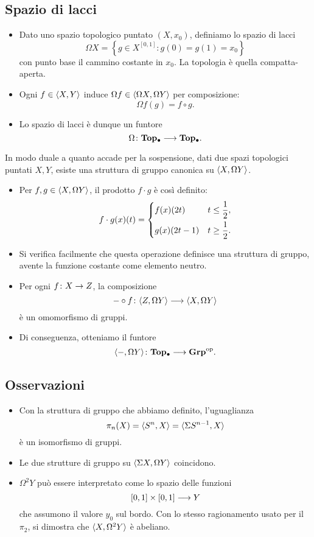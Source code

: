 \subsection*{Spazio di lacci}
\begin{frame*}
\begin{itemize}[<+->]
\item Dato uno spazio topologico puntato $(X,x_0)$, definiamo lo spazio di lacci
\[
\Omega X=\left\{g\in X^{[0,1]}:g(0)=g(1)=x_0\right\}
\]
con punto base il cammino costante in $x_0$. La topologia è quella compatta-aperta.
\item Ogni $f\in\langle X,Y\rangle$ induce $\Omega f\in\langle \Omega X,\Omega Y\rangle$ per composizione:
\[
\Omega f(g)=f\circ g.
\]
 \item Lo spazio di lacci è dunque un funtore
\[
\map{\Omega}{\Top0}{\Top0}.
\]
\end{itemize}
\end{frame*}

\begin{frame*}
In modo duale a quanto accade per la sospensione, dati due spazi topologici puntati $X,Y$, esiste una struttura di gruppo canonica su $\langle X,\Omega Y\rangle$.
\pause
\begin{itemize}[<+->]
\item Per $f,g\in\langle X,\Omega Y\rangle$, il prodotto $f\cdot g$ è così definito:
\[
f\cdot g(x)(t)=\begin{dcases}f(x)(2t)&t\le\frac{1}{2},\\g(x)(2t-1)&t\ge\frac{1}{2}.\end{dcases}
\]
\item Si verifica facilmente che questa operazione definisce una struttura di gruppo, avente la funzione costante come elemento neutro.
\item Per ogni $\map{f}{X}{Z}$, la composizione
\[
\map{-\circ f}{\hmaps{Z,\Omega Y}}{\hmaps{X,\Omega Y}}
\]
 è un omomorfismo di gruppi.
 \item Di conseguenza, otteniamo il funtore
 \[
 \map{\hmaps{-,\Omega Y}}{\Top0}{\Grp^{\text{op}}}.
 \]
\end{itemize}
\end{frame*}

\subsection*{Osservazioni}
\begin{frame*}
\begin{itemize}[<+->]
\item Con la struttura di gruppo che abbiamo definito, l'uguaglianza
\[
\pi_n(X)=\langle S^n,X\rangle=\langle \Sigma S^{n-1},X\rangle
\]
è un isomorfismo di gruppi.
\item Le due strutture di gruppo su  $\langle \Sigma X,\Omega Y\rangle$ coincidono.
\item $\Omega^2Y$ può essere interpretato come lo spazio delle funzioni
\[
\umap{[0,1]\times[0,1]}{Y}
\]
che assumono il valore $y_0$ sul bordo. Con lo stesso ragionamento usato per il $\pi_2$, si dimostra che $\langle X,\Omega^2Y\rangle$ è abeliano.
\end{itemize}
\end{frame*}

